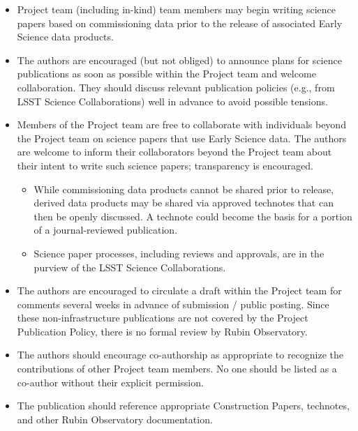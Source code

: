 \documentclass[SE,authoryear,toc,lsstdraft]{lsstdoc}
\begin{document}
\begin{itemize}

  \item Project team (including in-kind) team members may begin writing science papers based on commissioning data prior to the release of associated Early Science data products.

  \item The authors are encouraged (but not obliged) to announce plans for science publications as soon as possible within the Project team and welcome collaboration. They should discuss relevant publication policies (e.g., from LSST Science Collaborations) well in advance to avoid possible tensions.

  \item Members of the Project team are free to collaborate with individuals beyond the Project team on science papers that use Early Science data. The authors are welcome to inform their collaborators beyond the Project team about their intent to write such science papers; transparency is encouraged.

  \begin{itemize}

   \item  While commissioning data products cannot be shared prior to release, derived data products may be shared via approved technotes that can then be openly discussed. A technote could become the basis for a portion of a journal-reviewed publication.

   \item Science paper processes, including reviews and approvals, are in the purview of the LSST Science Collaborations.

  \end{itemize}

  \item The authors are encouraged to circulate a draft within the Project team for comments several weeks in advance of submission / public posting.
  Since these non-infrastructure publications are not covered by the Project Publication Policy, there is no formal review by Rubin Observatory.

  \item The authors should encourage co-authorship as appropriate to recognize the contributions of other Project team members. No one should be listed as a co-author without their explicit permission.

  \item The publication should reference appropriate Construction Papers, technotes, and other Rubin Observatory documentation.

\end{itemize}
\end{document}
